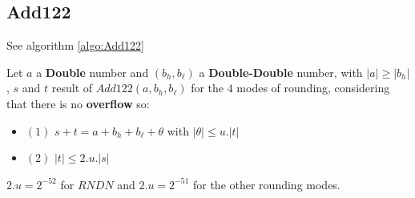 \subsection{Add122}
See algorithm \ref{algo:Add122}
\begin{lem}[Add122] Let $a$ a \textbf{Double} number and $(b_h,b_{\ell})$ a \textbf{Double-Double} number, with $\lvert a \rvert \ge \lvert b_h \rvert$, $s$ and $t$ result of $Add122(a,b_h,b_{\ell})$ for the $4$ modes of rounding, considering that there is no \textbf{overflow} so:
\begin{itemize}
    
    \item $(1)$ $s+t = a+b_h+b_{\ell} + \theta$ with $\lvert \theta \rvert \le u.\lvert t \rvert$
    \item  $(2)$ $ \lvert t \rvert \le 2.u. \lvert s \rvert$
\end{itemize}
\end{lem}
$2.u = 2^{-52}$ for $RNDN$ and $2.u = 2^{-51}$ for the other rounding modes.


